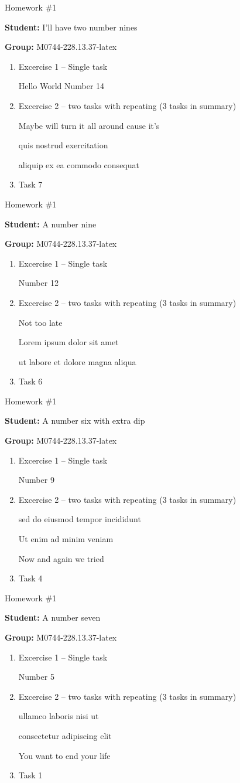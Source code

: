 \documentclass[12pt, fleqn, a4paper]{article}
\newcommand{\preamble}{\lipsum[1]}
\newcommand{\generatepage}[4]{
	\begin{center}
		{\Large #1}

		\textbf{Student:} #2

		\textbf{Group:} #3

	\end{center}

	\vspace{10pt}

	\preamble

	\begin{enumerate}
		#4
	\end{enumerate}

	\pagebreak
}
\begin{document}
	\generatepage{Homework \#1}{I'll have two number nines}{M0744-228.13.37-latex}{
		\item Excercise 1 -- Single task

			Hello World Number 14
		\item Excercise 2 -- two tasks with repeating (3 tasks in summary)

			Maybe will turn it all around cause it's

			quis nostrud exercitation 

			aliquip ex ea commodo consequat
		\item 

			Task 7
	}

	\generatepage{Homework \#1}{{\large A number nine}}{M0744-228.13.37-latex}{
		\item Excercise 1 -- Single task

			Number 12
		\item Excercise 2 -- two tasks with repeating (3 tasks in summary)

			Not too late

			Lorem ipsum dolor sit amet

			ut labore et dolore magna aliqua 
		\item 

			Task 6
	}

	\generatepage{Homework \#1}{A number six with extra dip}{M0744-228.13.37-latex}{
		\item Excercise 1 -- Single task

			Number 9
		\item Excercise 2 -- two tasks with repeating (3 tasks in summary)

			sed do eiusmod tempor incididunt 

			Ut enim ad minim veniam

			Now and again we tried
		\item 

			Task 4
	}

	\generatepage{Homework \#1}{A number seven}{M0744-228.13.37-latex}{
		\item Excercise 1 -- Single task

			Number 5
		\item Excercise 2 -- two tasks with repeating (3 tasks in summary)

			ullamco laboris nisi ut 

			consectetur adipiscing elit

			You want to end your life
		\item 

			Task 1
	}
\end{document}
